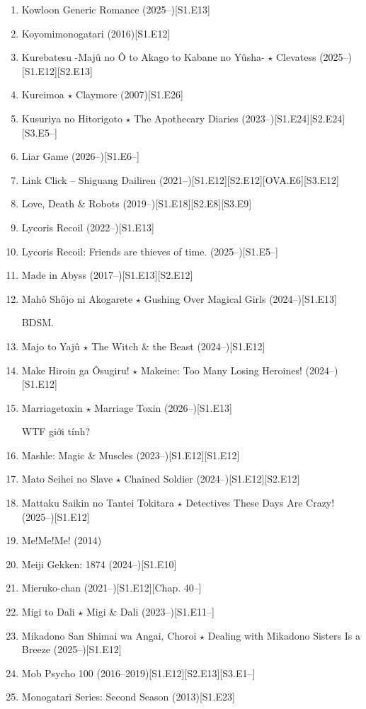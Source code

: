 \documentclass{article}
\begin{document}
\begin{enumerate}
    \item {\sc Kowloon Generic Romance} (2025--)\hfill[S1.E13]
    \item {\sc Koyomimonogatari} (2016)\hfill[S1.E12]
    \item {\sc Kurebatesu -Majû no Ô to Akago to Kabane no Yûsha- $\star$ Clevatess} (2025--)\hfill[S1.E12][S2.E13]
    \item {\sc Kureimoa $\star$ Claymore} (2007)\hfill[S1.E26]
    \item {\sc Kusuriya no Hitorigoto $\star$ The Apothecary Diaries} (2023--)\hfill[S1.E24][S2.E24][S3.E5--]
    \item Liar Game (2026--)\hfill[S1.E6--]
    \item Link Click -- Shiguang Dailiren (2021--)\hfill[S1.E12][S2.E12][OVA.E6][S3.E12]
    \item Love, Death \& Robots (2019--)\hfill[S1.E18][S2.E8][S3.E9]
    \item Lycoris Recoil (2022--)\hfill[S1.E13]
    \item Lycoris Recoil: Friends are thieves of time. (2025--)\hfill[S1.E5--]
    \item Made in Abyss (2017--)\hfill[S1.E13][S2.E12]
    \item Mahô Shôjo ni Akogarete $\star$ Gushing Over Magical Girls (2024--)\hfill[S1.E13]

    BDSM.
    \item {\sc Majo to Yajû $\star$ The Witch \& the Beast} (2024--)\hfill[S1.E12]
    \item {\sc Make Hiroin ga Ôsugiru! $\star$ Makeine: Too Many Losing Heroines!} (2024--)\hfill[S1.E12]
    \item {\sc Marriagetoxin $\star$ Marriage Toxin} (2026--)\hfill[S1.E13]
    
    WTF giới tính?
    \item {\sc Mashle: Magic \& Muscles} (2023--)\hfill[S1.E12][S1.E12]
    \item {\sc Mato Seihei no Slave $\star$ Chained Soldier} (2024--)\hfill[S1.E12][S2.E12]
    \item {\sc Mattaku Saikin no Tantei Tokitara $\star$ Detectives These Days Are Crazy!} (2025--)\hfill[S1.E12]
    \item {\sc Me!Me!Me!} (2014)
    \item {\sc Meiji Gekken: 1874} (2024--)\hfill[S1.E10]
    \item Mieruko-chan (2021--)\hfill[S1.E12][Chap. 40--]
    \item Migi to Dali $\star$ Migi \& Dali (2023--)\hfill[S1.E11--]
    \item {\sc Mikadono San Shimai wa Angai, Choroi $\star$ Dealing with Mikadono Sisters Is a Breeze} (2025--)\hfill[S1.E12]
    \item Mob Psycho 100 (2016--2019)\hfill[S1.E12][S2.E13][S3.E1--]
    \item {\sc Monogatari Series: Second Season} (2013)\hfill[S1.E23]


\end{enumerate}
\end{document}
